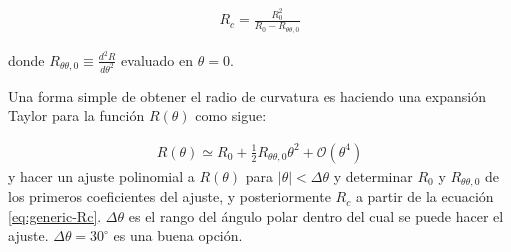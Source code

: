 \begin{align}
  R_c = \frac{R^2_0}{R_0 - R_{\theta\theta, 0}} \label{eq:generic-Rc}
\end{align}

donde $R_{\theta\theta, 0}\equiv \frac{d^2R}{d\theta^2}$ evaluado en $\theta = 0$.

Una forma simple de obtener el radio de curvatura es haciendo una expansión Taylor para la función $R(\theta)$ como sigue:

\begin{align}
  R(\theta) \simeq R_0 + \frac{1}{2}R_{\theta\theta, 0}\theta^2 + \mathcal{O}(\theta^4) \label{eq:R-poly}
\end{align}
y hacer un ajuste polinomial a $R(\theta)$ para $|\theta| < \Delta\theta$ y determinar $R_0$ y $R_{\theta\theta, 0}$ de los primeros coeficientes del ajuste, y posteriormente $R_c$ a partir de la ecuación \ref{eq:generic-Rc}. $\Delta\theta$ es el rango del ángulo polar dentro del cual se puede hacer el ajuste. $\Delta\theta = 30^\circ$ es una buena opción.

